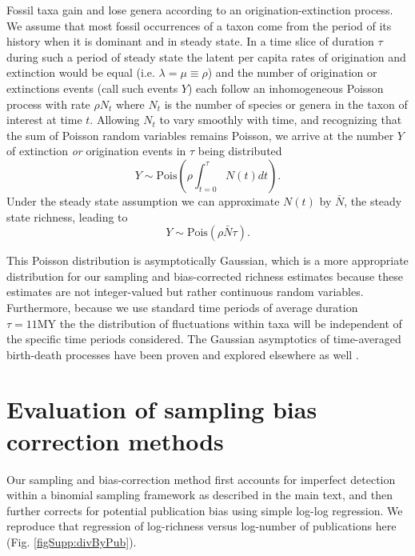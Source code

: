 \documentclass[12pt]{article}
\let\citep=\cite
\begin{document}
Fossil taxa gain and lose genera according to an origination-extinction
process. We assume that most fossil occurrences of a taxon come from
the period of its history when it is dominant and in steady state. In
a time slice of duration $\tau$ during such a period of steady state
the latent per capita rates of origination and extinction would be
equal (i.e. $\lambda = \mu \equiv \rho$) and the number of origination
or extinctions events (call such events $Y$) each follow an
inhomogeneous Poisson process with rate $\rho N_t$ where $N_t$ is the
number of species or genera in the taxon of interest at time
$t$. Allowing $N_t$ to vary smoothly with time, and recognizing that
the sum of Poisson random variables remains Poisson, we arrive at the
number $Y$ of extinction \emph{or} origination events in $\tau$ being
distributed
\begin{equation}
  \label{eq:eventPois1}
  Y \sim \text{Pois}\left(\rho \int_{t=0}^\tau N(t) dt\right).
\end{equation}
Under the steady state assumption we can approximate $N(t)$ by
$\bar{N}$, the steady state richness, leading to
\begin{equation}
  \label{eq:eventPois2}
  Y \sim \text{Pois}(\rho \bar{N} \tau).
\end{equation}

This Poisson distribution is asymptotically Gaussian, which is a more
appropriate distribution for our sampling and bias-corrected richness
estimates because these estimates are not integer-valued but rather
continuous random variables. Furthermore, because we use standard time
periods of average duration $\tau = 11\text{MY}$ the the distribution
of fluctuations within taxa will be independent of the specific time
periods considered. The Gaussian asymptotics of time-averaged
birth-death processes have been proven and explored elsewhere as well
\citep{keilson1970, grassmann1987}.


\section{Evaluation of sampling bias correction methods}
\label{sec:suppBiasEval}

Our sampling and bias-correction method first accounts for imperfect
detection within a binomial sampling framework as described in the
main text, and then further corrects for potential publication bias
using simple log-log regression.  We reproduce that regression of
log-richness versus log-number of publications here
(Fig. \ref{figSupp:divByPub}). 
\end{document}
